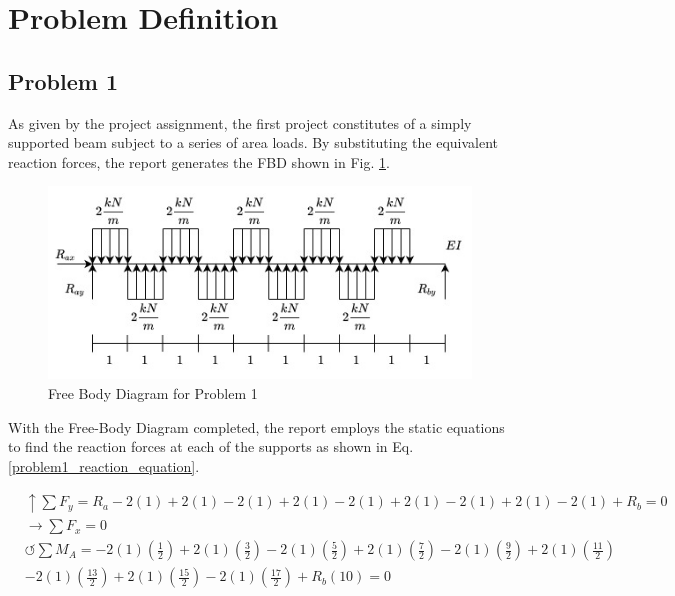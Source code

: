 \documentclass[a4paper]{article}
\begin{document}
\section{Problem Definition} \label{Problems}
\subsection{Problem 1}

As given by the project assignment, the first project constitutes of a simply supported beam subject to a series of area loads. By substituting the equivalent reaction forces, the report generates the FBD shown in Fig. \ref{FBD_1}.

\begin{figure}[h]
\includegraphics[width=\textwidth]{FBD/FBD_1.jpg}
\caption{Free Body Diagram for Problem 1}
\label{FBD_1}
\end{figure}

With the Free-Body Diagram completed, the report employs the static equations to find the reaction forces at each of the supports as shown in Eq. \ref{problem1_reaction_equation}.

\begin{equation}
\begin{split}
	&\uparrow \sum F_y = R_a - 2(1) + 2(1) - 2(1) + 2(1) - 2(1) + 2(1) - 2(1) + 2(1) - 2(1) + R_b = 0 \\
 	&\rightarrow \sum F_x = 0 \\
 	&\circlearrowleft \sum M_A = -2(1)\left(\frac{1}{2}\right) + 2(1)\left(\frac{3}{2}\right) - 2(1)\left(\frac{5}{2}\right) + 2(1)\left(\frac{7}{2}\right) - 2(1)\left(\frac{9}{2}\right) + 2(1)\left(\frac{11}{2}\right) \\ 
	& - 2(1)\left(\frac{13}{2}\right) + 2(1)\left(\frac{15}{2}\right) - 2(1)\left(\frac{17}{2}\right) + R_b(10) = 0 \\
\end{split}
\label{problem1_reaction_equation}
\end{equation}
\end{document}
